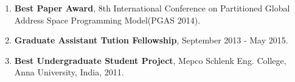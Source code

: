 \begin{enumerate}
\setcounter{enumi}{0}
\item \textbf{Best Paper Award}, 8th International Conference on Partitioned
    Global Address Space Programming Model(PGAS 2014).
\item \textbf{Graduate Assistant Tution Fellowship}, September 2013 - May 2015.
\item \textbf{Best Undergraduate Student Project}, Mepco Schlenk Eng. College,
    Anna University, India, 2011.
\end{enumerate}
